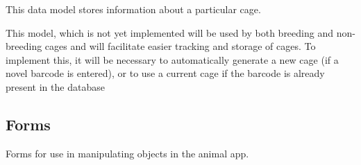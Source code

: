 \documentclass[letterpaper,10pt,english]{sphinxmanual}
\begin{document}
\begin{fulllineitems}
\label{api:animal.models.Cage}
This data model stores information about a particular cage.

This model, which is not yet implemented will be used by both breeding and non-breeding cages and will facilitate easier tracking and storage of cages.  To implement this, it will be necessary to automatically generate a new cage (if a novel barcode is entered), or to use a current cage if the barcode is already present in the database

\begin{fulllineitems}
\label{api:animal.models.Cage.DoesNotExist}
\end{fulllineitems}


\begin{fulllineitems}
\label{api:animal.models.Cage.MultipleObjectsReturned}
\end{fulllineitems}


\end{fulllineitems}



\subsection{Forms}
\label{api:id2}\label{api:module-animal.forms}
Forms for use in manipulating objects in the animal app.
\end{document}
